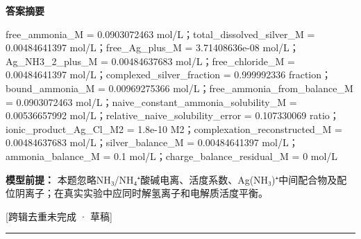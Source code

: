 \documentclass[UTF8,11pt,a4paper]{ctexart}
\begin{document}
\noindent\textbf{答案摘要}\par
free\_ammonia\_M = 0.0903072463 mol/L；total\_dissolved\_silver\_M = 0.00484641397 mol/L；free\_Ag\_plus\_M = 3.71408636e-08 mol/L；Ag\_NH3\_2\_plus\_M = 0.00484637683 mol/L；free\_chloride\_M = 0.00484641397 mol/L；complexed\_silver\_fraction = 0.999992336 fraction；bound\_ammonia\_M = 0.00969275366 mol/L；free\_ammonia\_from\_balance\_M = 0.0903072463 mol/L；naive\_constant\_ammonia\_solubility\_M = 0.00536657992 mol/L；relative\_naive\_solubility\_error = 0.107330069 ratio；ionic\_product\_Ag\_Cl\_M2 = 1.8e-10 M2；complexation\_reconstructed\_M = 0.00484637683 mol/L；silver\_balance\_M = 0.00484641397 mol/L；ammonia\_balance\_M = 0.1 mol/L；charge\_balance\_residual\_M = 0 mol/L\par
\noindent\textbf{模型前提：}
本题忽略NH₃/NH₄⁺酸碱电离、活度系数、Ag(NH₃)⁺中间配合物及配位阴离子；在真实实验中应同时解氢离子和电解质活度平衡。\par
\noindent\textcolor{red!65!black}{[跨辑去重未完成 · 草稿]} \par
\medskip\hrule\medskip
{}
\end{document}
